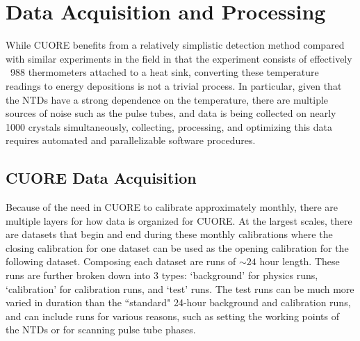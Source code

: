 \chapter{Data Acquisition and Processing}
\label{ch:Data Acquisition and Processing}

While CUORE benefits from a relatively simplistic detection method compared with similar experiments in the field in that the experiment consists of effectively ~988 thermometers attached to a heat sink, converting these temperature readings to energy depositions is not a trivial process.
In particular, given that the NTDs have a strong dependence on the temperature, there are multiple sources of noise such as the pulse tubes, and data is being collected on nearly 1000 crystals simultaneously, collecting, processing, and optimizing this data requires automated and parallelizable software procedures.

\section{CUORE Data Acquisition}
Because of the need in CUORE to calibrate approximately monthly, there are multiple layers for how data is organized for CUORE.
At the largest scales, there are datasets that begin and end during these monthly calibrations where the closing calibration for one dataset can be used as the opening calibration for the following dataset.
Composing each dataset are runs of $\sim24$ hour length.
These runs are further broken down into 3 types: `background' for physics runs, `calibration' for calibration runs, and `test' runs.
The test runs can be much more varied in duration than the ``standard" 24-hour background and calibration runs, and can include runs for various reasons, such as setting the working points of the NTDs or for scanning pulse tube phases.

